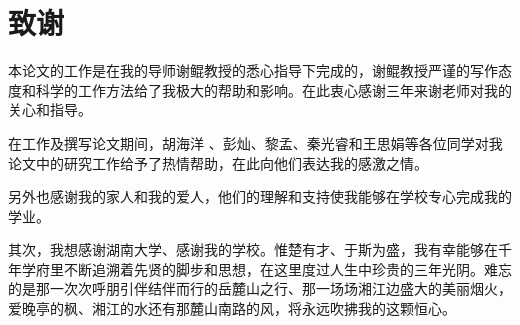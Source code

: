 \chapter*{致\quad 谢}
本论文的工作是在我的导师谢鲲教授的悉心指导下完成的，谢鲲教授严谨的写作态度和科学的工作方法给了我极大的帮助和影响。在此衷心感谢三年来谢老师对我的关心和指导。



在工作及撰写论文期间，胡海洋 、彭灿、黎孟、秦光睿和王思娟等各位同学对我论文中的研究工作给予了热情帮助，在此向他们表达我的感激之情。

另外也感谢我的家人和我的爱人，他们的理解和支持使我能够在学校专心完成我的学业。

其次，我想感谢湖南大学、感谢我的学校。惟楚有才、于斯为盛，我有幸能够在千年学府里不断追溯着先贤的脚步和思想，在这里度过人生中珍贵的三年光阴。难忘的是那一次次呼朋引伴结伴而行的岳麓山之行、那一场场湘江边盛大的美丽烟火，爱晚亭的枫、湘江的水还有那麓山南路的风，将永远吹拂我的这颗恒心。


